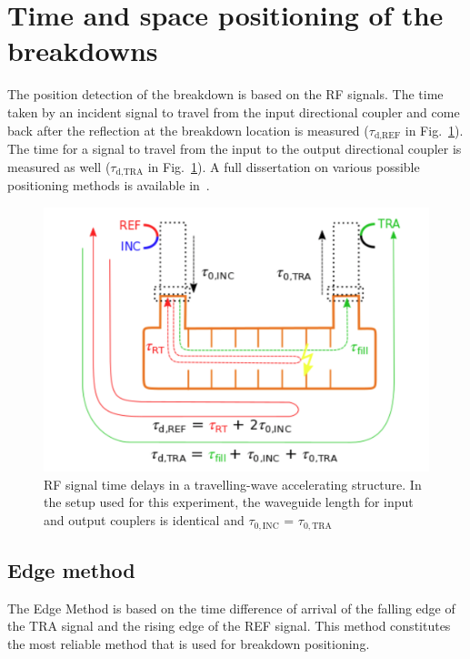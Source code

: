\section[Time and space positioning of the breakdowns]{Time and space positioning of the breakdowns}

The position detection of the breakdown is based on the RF signals. The time taken by an incident signal to travel from the input directional coupler and come back after the reflection at the breakdown location is measured ($\tau_\text{d,REF}$  in Fig.~\ref{BD_scheme}). The time for a signal to travel from the input to the output directional coupler is measured as well ($\tau_\text{d,TRA}$ in Fig.~\ref{BD_scheme}).  A full dissertation on various possible positioning methods is available in~\cite{Rajamaki:2143815}.

\begin{figure}[h]
\centering 
\includegraphics[scale=0.3]{pictures/structure_scheme}
\caption{RF signal time delays in a travelling-wave accelerating structure. In the setup used for this experiment, the waveguide length for input and output couplers is identical and $\tau_{0,\text{INC}}$ = $\tau_{0,\text{TRA}}$}
\label{BD_scheme}
\end{figure}


\subsection[Edge method]{Edge method}

The Edge Method is based on the time difference of arrival of the falling edge of the TRA signal and the rising edge of the REF signal. This method constitutes the most reliable method that is used for breakdown positioning. 

